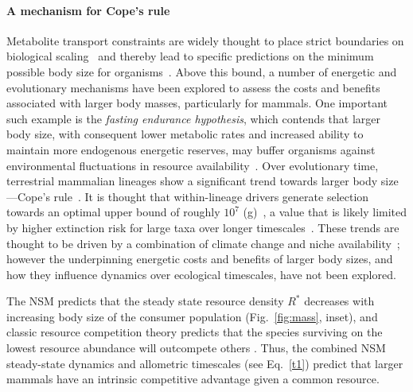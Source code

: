 \documentclass[twocolumn,preprintnumbers,amsmath,amssymb,superscriptaddress]{revtex4}
\begin{document}
\begin{bibunit}[unsrt]
  \noindent \paragraph*{{\bf A mechanism for Cope's rule}} Metabolite transport
  constraints are widely thought to place strict boundaries on biological
  scaling~\citep{Brown:1993p708,West:1997cg,Brown:2004wq} and thereby lead to
  specific predictions on the minimum possible body size for
  organisms~\citep{West:2002ud}.  Above this bound, a number of energetic and
  evolutionary mechanisms have been explored to assess the costs and benefits
  associated with larger body masses, particularly for mammals.  One important
  such example is the \emph{fasting endurance hypothesis}, which contends that
  larger body size, with consequent lower metabolic rates and increased ability
  to maintain more endogenous energetic reserves, may buffer organisms against
  environmental fluctuations in resource availability~\citep{Millar:1990p923}.
  Over evolutionary time, terrestrial mammalian lineages show a significant
  trend towards larger body size---Cope's
  rule~\citep{Alroy:1998p1594,Clauset:2009fh,Smith:2010p3442,Saarinen:2014br}.
  It is thought that within-lineage drivers generate selection towards an
  optimal upper bound of roughly $10^7$ (g)~\citep{Alroy:1998p1594}, a value
  that is likely limited by higher extinction risk for large taxa over longer
  timescales~\citep{Clauset:2009fh}.  These trends are thought to be driven by
  a combination of climate change and niche
  availability~\citep{Saarinen:2014br}; however the underpinning energetic
  costs and benefits of larger body sizes, and how they influence dynamics over
  ecological timescales, have not been explored.



  The NSM predicts that the steady state resource density $R^{*}$ decreases
  with increasing body size of the consumer population (Fig.~\ref{fig:mass},
  inset), and classic resource competition theory predicts that the species
  surviving on the lowest resource abundance will outcompete others
  \citep{tilman1981,dutkiewicz2009,barton2010}. Thus, the combined NSM
  steady-state dynamics and allometric timescales (see Eq.~\eqref{t1}) predict
  that larger mammals have an intrinsic competitive advantage given a common
  resource.  


\end{bibunit}
\end{document}
